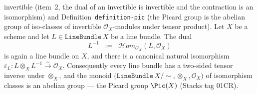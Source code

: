 \begin{lemma}
{{  invertible} (item~2, the dual of an invertible is invertible and the contraction
  is an isomorphism) and Definition~\texttt{definition-pic} (the Picard group is
  the abelian group of iso-classes of invertible \(\mathcal{O}_X\)-modules under
  tensor product).}
  Let \(X\) be a scheme and let \(L \in \texttt{LineBundle}\,X\) be a line
  bundle. The dual
  \[
    L^{-1} \;\;:=\;\; \mathcal{H}om_{\mathcal{O}_X}(L, \mathcal{O}_X)
  \]
  is again a line bundle on \(X\), and there is a canonical natural
  isomorphism
  \(\varepsilon_L : L \otimes_X L^{-1} \xrightarrow{\sim} \mathcal{O}_X\).
  Consequently every line bundle has a two-sided tensor inverse under
  \(\otimes_X\), and the monoid \(\bigl(\texttt{LineBundle}\,X / \sim, \otimes_X,
  \mathcal{O}_X\bigr)\) of isomorphism classes is an abelian group ---
  the Picard group \(\Pic(X)\) (Stacks tag 01CR).
\end{lemma}

